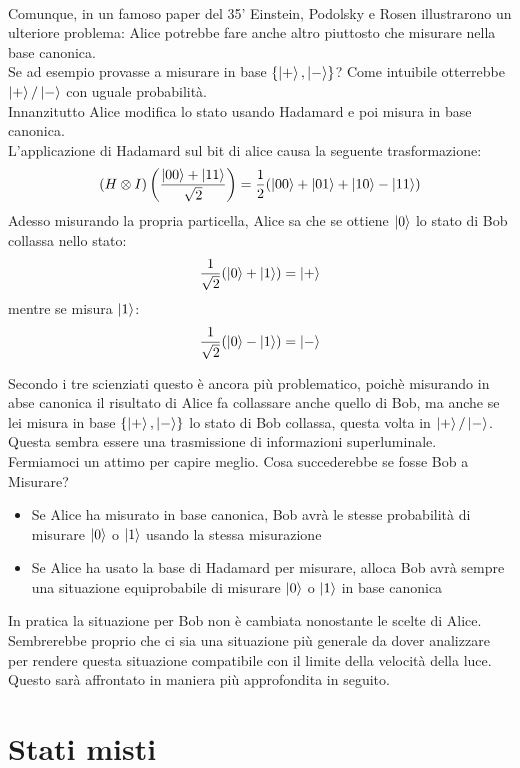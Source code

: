 \documentclass{article}
\begin{document}
    \\ Comunque, in un famoso paper del 35' Einstein, Podolsky e Rosen illustrarono un ulteriore problema: Alice potrebbe fare anche altro piuttosto che misurare nella base canonica.
    \medskip
    \\Se ad esempio provasse a misurare in base $\{\ket{+},\ket{-}\}$? Come intuibile otterrebbe $\ket{+}/\ket{-}$ con uguale probabilità. 
    \\Innanzitutto Alice modifica lo stato usando Hadamard e poi misura in base canonica.
    \\L'applicazione di Hadamard sul bit di alice causa la seguente trasformazione:
    \[
    (H \otimes I)\left(\frac{\ket{00}+ \ket{11}}{\sqrt{2}}\right) = \frac{1}{2} (\ket{00}+ \ket{01} + \ket{10} -\ket{11})
    \]
    Adesso misurando la propria particella, Alice sa che se ottiene $\ket{0}$ lo stato di Bob collassa nello stato:
    \[
    \frac{1}{\sqrt{2}}(\ket{0}+\ket{1}) = \ket{+}
    \]
    mentre se misura $\ket{1}$:
    \[
    \frac{1}{\sqrt{2}} (\ket{0}- \ket{1})= \ket{-}
    \]

    Secondo i tre scienziati questo è ancora più problematico, poichè misurando in abse canonica il risultato di Alice fa collassare anche quello di Bob, ma anche se lei misura in base $\{\ket{+},\ket{-}\}$ lo stato di Bob collassa, questa volta in $\ket{+}/\ket{-}$. Questa sembra essere una trasmissione di informazioni superluminale.
    \medskip
    \\ Fermiamoci un attimo per capire meglio. Cosa succederebbe se fosse Bob a Misurare?
    \begin{itemize}
        \item Se Alice ha misurato in base canonica, Bob avrà le stesse probabilità di misurare $\ket{0}$ o $\ket{1}$ usando la stessa misurazione
        \item Se Alice ha usato la base di Hadamard per misurare, alloca Bob avrà sempre una situazione equiprobabile di misurare $\ket{0}$ o $\ket{1}$ in base canonica
    \end{itemize}
    In pratica la situazione per Bob non è cambiata nonostante le scelte di Alice. Sembrerebbe proprio che ci sia una situazione più generale da dover analizzare per rendere questa situazione compatibile con il limite della velocità della luce. Questo sarà affrontato in maniera più approfondita in seguito.






    \section{Stati misti}






    
    
    
\end{document}
